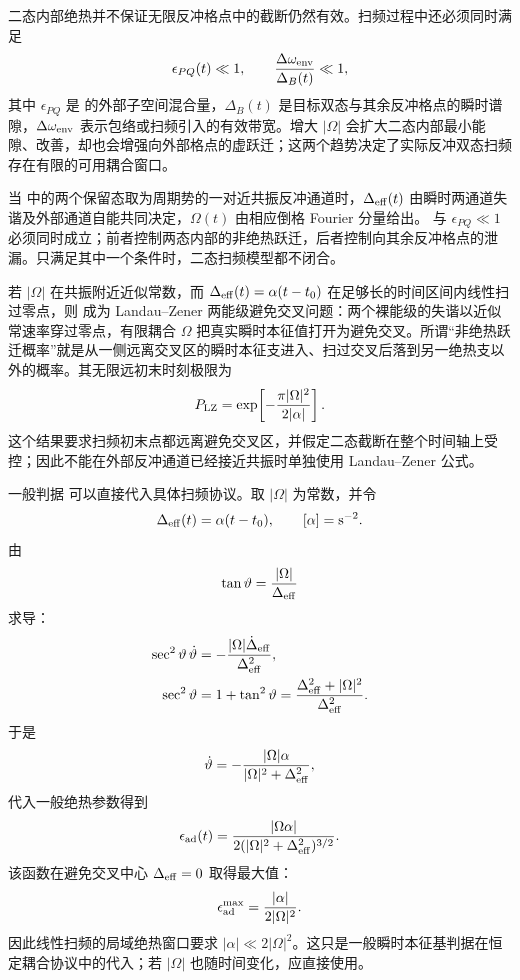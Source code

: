 二态内部绝热并不保证无限反冲格点中的截断仍然有效。扫频过程中还必须同时满足
\begin{equation*}
 \epsilon_{PQ}(t)\ll1,
 \qquad
 \frac{\Delta\omega_{\rm env}}{\Delta_B(t)}\ll1,
\end{equation*}
其中 $\epsilon_{PQ}$ 是 的外部子空间混合量，$\Delta_B(t)$ 是目标双态与其余反冲格点的瞬时谱隙，$\Delta\omega_{\rm env}$ 表示包络或扫频引入的有效带宽。增大 $|\Omega|$ 会扩大二态内部最小能隙、改善，却也会增强向外部格点的虚跃迁；这两个趋势决定了实际反冲双态扫频存在有限的可用耦合窗口。

当 中的两个保留态取为周期势的一对近共振反冲通道时，$\Delta_{\rm eff}(t)$ 由瞬时两通道失谐及外部通道自能共同决定，$\Omega(t)$ 由相应倒格 Fourier 分量给出。 与 $\epsilon_{PQ}\ll1$ 必须同时成立；前者控制两态内部的非绝热跃迁，后者控制向其余反冲格点的泄漏。只满足其中一个条件时，二态扫频模型都不闭合。

若 $|\Omega|$ 在共振附近近似常数，而 $\Delta_{\rm eff}(t)=\alpha(t-t_0)$ 在足够长的时间区间内线性扫过零点，则 成为 Landau--Zener 两能级避免交叉问题：两个裸能级的失谐以近似常速率穿过零点，有限耦合 $\Omega$ 把真实瞬时本征值打开为避免交叉。所谓“非绝热跃迁概率”就是从一侧远离交叉区的瞬时本征支进入、扫过交叉后落到另一绝热支以外的概率。其无限远初末时刻极限为
\begin{equation*}
 P_{\rm LZ}=\exp\!\left[-\frac{\pi|\Omega|^2}{2|\alpha|}\right].
\end{equation*}
这个结果要求扫频初末点都远离避免交叉区，并假定二态截断在整个时间轴上受控；因此不能在外部反冲通道已经接近共振时单独使用 Landau--Zener 公式。

\begin{exbox}[恒定耦合线性扫频]
一般判据 可以直接代入具体扫频协议。取 $|\Omega|$ 为常数，并令
\[
\Delta_{\rm eff}(t)=\alpha(t-t_0),
\qquad [\alpha]={\rm s^{-2}}.
\]
由
\[
\tan\vartheta=\frac{|\Omega|}{\Delta_{\rm eff}}
\]
求导：
\begin{align*}
\sec^2\vartheta\,\dot\vartheta
&=-\frac{|\Omega|\dot\Delta_{\rm eff}}{\Delta_{\rm eff}^2},\\
\sec^2\vartheta
&=1+\tan^2\vartheta
=\frac{\Delta_{\rm eff}^2+|\Omega|^2}{\Delta_{\rm eff}^2}.
\end{align*}
于是
\[
\dot\vartheta
=-\frac{|\Omega|\alpha}{|\Omega|^2+\Delta_{\rm eff}^2},
\]
代入一般绝热参数得到
\[
\epsilon_{\rm ad}(t)
=\frac{|\Omega\alpha|}
{2(|\Omega|^2+\Delta_{\rm eff}^2)^{3/2}}.
\]
该函数在避免交叉中心 $\Delta_{\rm eff}=0$ 取得最大值：
\[
\epsilon_{\rm ad}^{\max}
=\frac{|\alpha|}{2|\Omega|^2}.
\]
因此线性扫频的局域绝热窗口要求 $|\alpha|\ll2|\Omega|^2$。这只是一般瞬时本征基判据在恒定耦合协议中的代入；若 $|\Omega|$ 也随时间变化，应直接使用。
\end{exbox}

